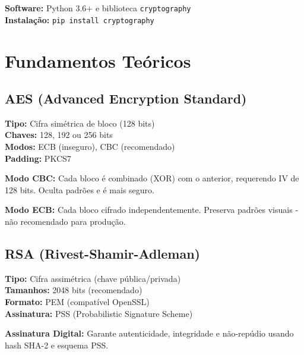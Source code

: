 \documentclass[12pt,a4paper]{article}
\begin{document}
\begin{tcolorbox}[colback=darkblue!5,colframe=darkblue!50]
\textbf{Software:} Python 3.6+ e biblioteca \texttt{cryptography}\\
\textbf{Instalação:} \texttt{pip install cryptography}
\end{tcolorbox}

\section{Fundamentos Teóricos}

\subsection{AES (Advanced Encryption Standard)}

\begin{tcolorbox}[colback=lightblue!5,colframe=primaryblue,title=\faKey\ Características]
\textbf{Tipo:} Cifra simétrica de bloco (128 bits)\\
\textbf{Chaves:} 128, 192 ou 256 bits\\
\textbf{Modos:} ECB (inseguro), CBC (recomendado)\\
\textbf{Padding:} PKCS7
\end{tcolorbox}

\textbf{Modo CBC:} Cada bloco é combinado (XOR) com o anterior, requerendo IV de 128 bits. Oculta padrões e é mais seguro.

\textbf{Modo ECB:} Cada bloco cifrado independentemente. Preserva padrões visuais - não recomendado para produção.

\subsection{RSA (Rivest-Shamir-Adleman)}

\begin{tcolorbox}[colback=successgreen!5,colframe=successgreen,title=\faLock\ Características]
\textbf{Tipo:} Cifra assimétrica (chave pública/privada)\\
\textbf{Tamanhos:} 2048 bits (recomendado)\\
\textbf{Formato:} PEM (compatível OpenSSL)\\
\textbf{Assinatura:} PSS (Probabilistic Signature Scheme)
\end{tcolorbox}

\textbf{Assinatura Digital:} Garante autenticidade, integridade e não-repúdio usando hash SHA-2 e esquema PSS.
\end{document}

